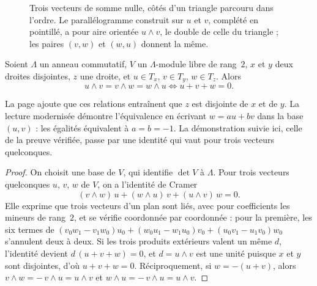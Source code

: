 \begin{figure}[htbp]
\centering
{}
\caption{Trois vecteurs de somme nulle, côtés d'un triangle parcouru dans l'ordre. Le parallélogramme construit sur $u$ et $v$, complété en pointillé, a pour aire orientée $u \wedge v$, le double de celle du triangle ; les paires $(v, w)$ et $(w, u)$ donnent la même.}
\label{fig:89-triangle}
\end{figure}

\begin{encadre}
\begin{enonce}
Soient $\Lambda$ un anneau commutatif, $V$ un $\Lambda$-module libre de rang~$2$, $x$ et $y$ deux droites disjointes, $z$ une droite, et $u \in T_x$, $v \in T_y$, $w \in T_z$. Alors
\[ u \wedge v = v \wedge w = w \wedge u \iff u + v + w = 0 . \]
\end{enonce}
\end{encadre}

\noindent La page ajoute que ces relations entraînent que $z$ est disjointe de $x$ et de $y$. La lecture modernisée démontre l'équivalence en écrivant $w = au + bv$ dans la base $(u, v)$ : les égalités équivalent à $a = b = -1$. La démonstration suivie ici, celle de la preuve vérifiée, passe par une identité qui vaut pour trois vecteurs quelconques.

\begin{proof}
On choisit une base de $V$, qui identifie $\det V$ à $\Lambda$. Pour trois vecteurs quelconques $u$, $v$, $w$ de $V$, on a l'identité de Cramer
\[ (v \wedge w)\, u + (w \wedge u)\, v + (u \wedge v)\, w = 0 . \]
Elle exprime que trois vecteurs d'un plan sont liés, avec pour coefficients les mineurs de rang~$2$, et se vérifie coordonnée par coordonnée : pour la première, les six termes de $(v_0 w_1 - v_1 w_0) u_0 + (w_0 u_1 - w_1 u_0) v_0 + (u_0 v_1 - u_1 v_0) w_0$ s'annulent deux à deux. Si les trois produits extérieurs valent un même $d$, l'identité devient $d\,(u + v + w) = 0$, et $d = u \wedge v$ est une unité puisque $x$ et $y$ sont disjointes, d'où $u + v + w = 0$. Réciproquement, si $w = -(u + v)$, alors $v \wedge w = -\,v \wedge u = u \wedge v$ et $w \wedge u = -\,v \wedge u = u \wedge v$.
\end{proof}

